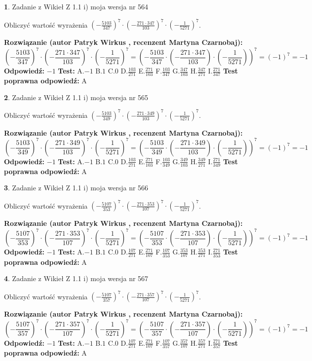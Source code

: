 \documentclass[12pt, a4paper]{article}
\theoremstyle{definition} %
\newtheorem{zad}{}
\newcommand{\zadStart}[1]{\begin{zad}#1\newline}
\newcommand{\zadStop}{\end{zad}}
\newcommand{\rozwStart}[2]{\noindent \textbf{Rozwiązanie (autor #1 , recenzent #2): }\newline}
\newcommand{\rozwStop}{\newline}
\newcommand{\odpStart}{\noindent \textbf{Odpowiedź:}\newline}
\newcommand{\odpStop}{\newline}
\newcommand{\testStart}{\noindent \textbf{Test:}\newline}
\newcommand{\testStop}{\newline}
\newcommand{\kluczStart}{\noindent \textbf{Test poprawna odpowiedź:}\newline}
\newcommand{\kluczStop}{\newline}
\begin{document}
\zadStart{Zadanie z Wikieł Z 1.1 i) moja wersja nr 564}

Obliczyć wartość wyrażenia $(-\frac{5103}{347})^{7} \cdot (-\frac{271 \cdot 347}{103})^{7} \cdot (-\frac{1}{5271})^{7}$.
\zadStop
\rozwStart{Patryk Wirkus}{Martyna Czarnobaj}
$$(-\frac{5103}{347})^{7} \cdot (-\frac{271 \cdot 347}{103})^{7} \cdot (-\frac{1}{5271})^{7} = (-\frac{5103}{347} \cdot (-\frac{271 \cdot 347}{103}) \cdot (-\frac{1}{5271}))^{7} = (-1)^{7} = -1$$
\rozwStop
\odpStart
$-1$
\odpStop
\testStart
A.$-1$ B.$1$ C.$0$ D.$\frac{103}{271}$ E.$\frac{271}{103}$
F.$\frac{103}{347}$ G.$\frac{347}{103}$
H.$\frac{347}{271}$
I.$\frac{271}{347}$
\testStop
\kluczStart
A
\kluczStop



\zadStart{Zadanie z Wikieł Z 1.1 i) moja wersja nr 565}

Obliczyć wartość wyrażenia $(-\frac{5103}{349})^{7} \cdot (-\frac{271 \cdot 349}{103})^{7} \cdot (-\frac{1}{5271})^{7}$.
\zadStop
\rozwStart{Patryk Wirkus}{Martyna Czarnobaj}
$$(-\frac{5103}{349})^{7} \cdot (-\frac{271 \cdot 349}{103})^{7} \cdot (-\frac{1}{5271})^{7} = (-\frac{5103}{349} \cdot (-\frac{271 \cdot 349}{103}) \cdot (-\frac{1}{5271}))^{7} = (-1)^{7} = -1$$
\rozwStop
\odpStart
$-1$
\odpStop
\testStart
A.$-1$ B.$1$ C.$0$ D.$\frac{103}{271}$ E.$\frac{271}{103}$
F.$\frac{103}{349}$ G.$\frac{349}{103}$
H.$\frac{349}{271}$
I.$\frac{271}{349}$
\testStop
\kluczStart
A
\kluczStop



\zadStart{Zadanie z Wikieł Z 1.1 i) moja wersja nr 566}

Obliczyć wartość wyrażenia $(-\frac{5107}{353})^{7} \cdot (-\frac{271 \cdot 353}{107})^{7} \cdot (-\frac{1}{5271})^{7}$.
\zadStop
\rozwStart{Patryk Wirkus}{Martyna Czarnobaj}
$$(-\frac{5107}{353})^{7} \cdot (-\frac{271 \cdot 353}{107})^{7} \cdot (-\frac{1}{5271})^{7} = (-\frac{5107}{353} \cdot (-\frac{271 \cdot 353}{107}) \cdot (-\frac{1}{5271}))^{7} = (-1)^{7} = -1$$
\rozwStop
\odpStart
$-1$
\odpStop
\testStart
A.$-1$ B.$1$ C.$0$ D.$\frac{107}{271}$ E.$\frac{271}{107}$
F.$\frac{107}{353}$ G.$\frac{353}{107}$
H.$\frac{353}{271}$
I.$\frac{271}{353}$
\testStop
\kluczStart
A
\kluczStop



\zadStart{Zadanie z Wikieł Z 1.1 i) moja wersja nr 567}

Obliczyć wartość wyrażenia $(-\frac{5107}{357})^{7} \cdot (-\frac{271 \cdot 357}{107})^{7} \cdot (-\frac{1}{5271})^{7}$.
\zadStop
\rozwStart{Patryk Wirkus}{Martyna Czarnobaj}
$$(-\frac{5107}{357})^{7} \cdot (-\frac{271 \cdot 357}{107})^{7} \cdot (-\frac{1}{5271})^{7} = (-\frac{5107}{357} \cdot (-\frac{271 \cdot 357}{107}) \cdot (-\frac{1}{5271}))^{7} = (-1)^{7} = -1$$
\rozwStop
\odpStart
$-1$
\odpStop
\testStart
A.$-1$ B.$1$ C.$0$ D.$\frac{107}{271}$ E.$\frac{271}{107}$
F.$\frac{107}{357}$ G.$\frac{357}{107}$
H.$\frac{357}{271}$
I.$\frac{271}{357}$
\testStop
\kluczStart
A
\kluczStop
\end{document}
